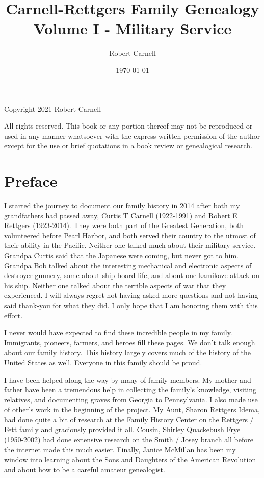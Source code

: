 \documentclass[11pt,letter]{book}
\title{\bf Carnell-Rettgers Family Genealogy \\
       \large Volume I - Military Service}
\author{Robert Carnell}
\date{\today}
\begin{document}
\frontmatter
\maketitle
\clearpage

\begingroup
\parindent 0pt
\parskip
\baselineskip
Copyright \textcopyright{} 2021 Robert Carnell

All rights reserved.  This book or any portion thereof may not be reproduced or used in any manner whatsoever with the express written permission of the author except for the use or brief quotations in a book review or genealogical research.
\endgroup
\clearpage

\chapter{Preface}

I started the journey to document our family history in 2014 after both my grandfathers had passed away, Curtis T Carnell (1922-1991) and Robert E Rettgers (1923-2014).  They were both part of the Greatest Generation, both volunteered before Pearl Harbor, and both served their country to the utmost of their ability in the Pacific.  Neither one talked much about their military service.  Grandpa Curtis said that the Japanese were coming, but never got to him.  Grandpa Bob talked about the interesting mechanical and electronic aspects of destroyer gunnery, some about ship board life, and about one kamikaze attack on his ship.  Neither one talked about the terrible aspects of war that they experienced.  I will always regret not having asked more questions and not having said thank-you for what they did.  I only hope that I am honoring them with this effort.  

I never would have expected to find these incredible people in my family.  Immigrants, pioneers, farmers, and heroes fill these pages.  We don't talk enough about our family history.  This history largely covers much of the history of the United States as well.  Everyone in this family should be proud.

I have been helped along the way by many of family members.  My mother and father have been a tremendous help in collecting the family's knowledge, visiting relatives, and documenting graves from Georgia to Pennsylvania.  I also made use of other's work in the beginning of the project.  My Aunt, Sharon Rettgers Idema, had done quite a bit of research at the Family History Center on the Rettgers / Fett family and graciously provided it all.  Cousin, Shirley Quackebush Frye (1950-2002) had done extensive research on the Smith / Josey branch all before the internet made this much easier.  Finally, Janice McMillan has been my window into learning about the Sons and Daughters of the American Revolution and about how to be a careful amateur genealogist.
\end{document}
